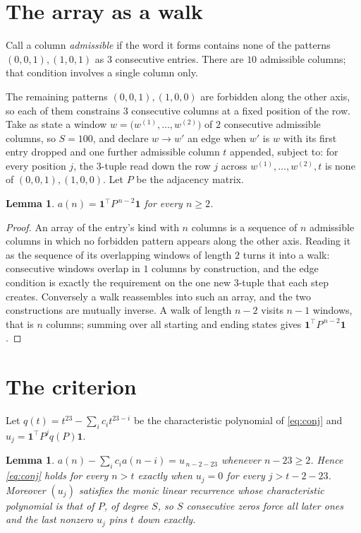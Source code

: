 \documentclass[11pt,a4paper]{article}
\theoremstyle{plain}
\newtheorem{lemma}[theorem]{Lemma}
\theoremstyle{definition}
\begin{document}
\section{The array as a walk}

Call a column \emph{admissible} if the word it forms contains none of the patterns
$(0,0,1), (1,0,1)$ as $3$ consecutive entries. There are $10$ admissible columns; that condition
involves a single column only.

The remaining patterns $(0,0,1), (1,0,0)$ are forbidden along the other axis, so each of them
constrains $3$ consecutive columns at a fixed position of the row. Take as state a
window $w=\bigl(w^{(1)},\dots,w^{(2)}\bigr)$ of $2$ consecutive admissible
columns, so $S=100$, and declare $w\to w'$ an edge when $w'$ is $w$ with its first entry
dropped and one further admissible column $t$ appended, subject to: for every position
$j$, the $3$-tuple read down the row $j$ across $w^{(1)},\dots,w^{(2)},t$
is none of $(0,0,1), (1,0,0)$. Let $P$ be the adjacency matrix.

\begin{lemma}\label{lem:walk}
$a(n)=\mathbf{1}^{\!\top}P^{\,n-2}\mathbf{1}$ for every $n\ge2$.
\end{lemma}

\begin{proof}
An array of the entry's kind with $n$ columns is a sequence of $n$ admissible columns in
which no forbidden pattern appears along the other axis. Reading it as the sequence of its
overlapping windows of length $2$ turns it into a walk: consecutive windows overlap in
$1$ columns by construction, and the edge condition is exactly the requirement on the one
new $3$-tuple that each step creates. Conversely a walk reassembles into such an array,
and the two constructions are mutually inverse. A walk of length $n-2$ visits $n-1$
windows, that is $n$ columns; summing over all starting and ending states gives
$\mathbf{1}^{\!\top}P^{\,n-2}\mathbf{1}$.
\end{proof}

\section{The criterion}

Let $q(t)=t^{23}-\sum_i c_i t^{23-i}$ be the characteristic polynomial of
\eqref{eq:conj} and $u_j=\mathbf{1}^{\!\top}P^{j}q(P)\mathbf{1}$.

\begin{lemma}\label{lem:crit}
$a(n)-\sum_i c_i a(n-i)=u_{\,n-2-23}$ whenever $n-23\ge2$. Hence
\eqref{eq:conj} holds for every $n>t$ exactly when $u_j=0$ for every
$j>t-2-23$. Moreover $(u_j)$ satisfies the monic linear recurrence whose
characteristic polynomial is that of $P$, of degree $S$, so $S$ consecutive zeros force all
later ones and the last nonzero $u_j$ pins $t$ down exactly.
\end{lemma}
\end{document}
